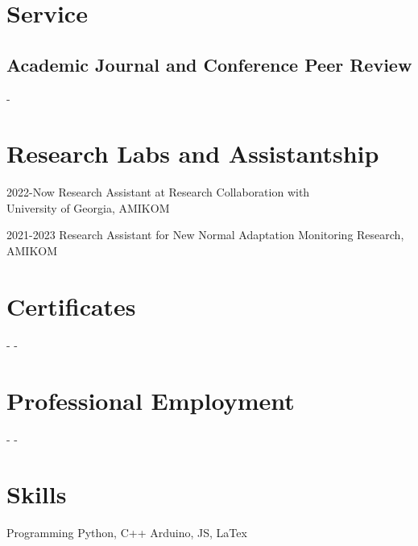 \documentclass[12pt,letterpaper]{report}
\newcommand{\listitemspace}{0.25em}
\renewenvironment{itemize}
{\begin{list}{}{\setlength{\leftmargin}{0em}
                \setlength{\parskip}{0em}
                \setlength{\itemsep}{\listitemspace}
                \setlength{\parsep}{\listitemspace}}}
{\end{list}}
\begin{document}
    \section*{Service}
    \subsection*{Academic Journal and Conference Peer Review}
    \begin{itemize}
        \item -
    \end{itemize}

    \section*{Research Labs and Assistantship}
    \begin{tablist}
        \item[2022-Now] \tab{}Research Assistant at Research Collaboration with \\ University of Georgia, AMIKOM
        \item[2021-2023] \tab{}Research Assistant for New Normal Adaptation Monitoring Research, AMIKOM
    \end{tablist}

    \section*{Certificates}
    \begin{tablist}
        \item[-] \tab{}-
    \end{tablist}

    \section*{Professional Employment}
    \begin{tablist}
        \item[-] \tab{}-
    \end{tablist}

    \section*{Skills}
    \begin{tablist}
        \item[Programming] \tab{}Python, C++ Arduino, JS, LaTex
    \end{tablist}
\end{document}
